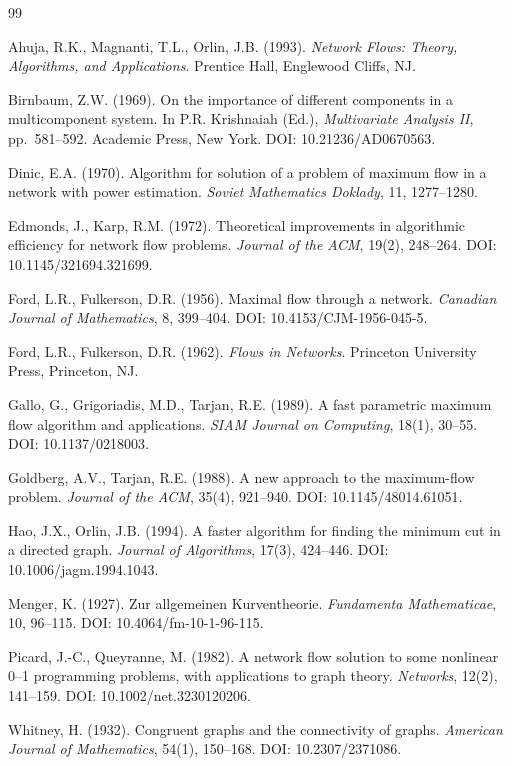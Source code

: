 \documentclass[12pt]{report}
\begin{document}
\begin{thebibliography}{99}

Ahuja, R.K., Magnanti, T.L., Orlin, J.B. (1993). \textit{Network Flows: Theory, Algorithms, and Applications}. Prentice Hall, Englewood Cliffs, NJ.

Birnbaum, Z.W. (1969). On the importance of different components in a multicomponent system. In P.R. Krishnaiah (Ed.), \textit{Multivariate Analysis II}, pp.\ 581--592. Academic Press, New York. DOI: 10.21236/AD0670563.

Dinic, E.A. (1970). Algorithm for solution of a problem of maximum flow in a network with power estimation. \textit{Soviet Mathematics Doklady}, 11, 1277--1280.

Edmonds, J., Karp, R.M. (1972). Theoretical improvements in algorithmic efficiency for network flow problems. \textit{Journal of the ACM}, 19(2), 248--264. DOI: 10.1145/321694.321699.

Ford, L.R., Fulkerson, D.R. (1956). Maximal flow through a network. \textit{Canadian Journal of Mathematics}, 8, 399--404. DOI: 10.4153/CJM-1956-045-5.

Ford, L.R., Fulkerson, D.R. (1962). \textit{Flows in Networks}. Princeton University Press, Princeton, NJ.

Gallo, G., Grigoriadis, M.D., Tarjan, R.E. (1989). A fast parametric maximum flow algorithm and applications. \textit{SIAM Journal on Computing}, 18(1), 30--55. DOI: 10.1137/0218003.

Goldberg, A.V., Tarjan, R.E. (1988). A new approach to the maximum-flow problem. \textit{Journal of the ACM}, 35(4), 921--940. DOI: 10.1145/48014.61051.

Hao, J.X., Orlin, J.B. (1994). A faster algorithm for finding the minimum cut in a directed graph. \textit{Journal of Algorithms}, 17(3), 424--446. DOI: 10.1006/jagm.1994.1043.

Menger, K. (1927). Zur allgemeinen Kurventheorie. \textit{Fundamenta Mathematicae}, 10, 96--115. DOI: 10.4064/fm-10-1-96-115.

Picard, J.-C., Queyranne, M. (1982). A network flow solution to some nonlinear 0--1 programming problems, with applications to graph theory. \textit{Networks}, 12(2), 141--159. DOI: 10.1002/net.3230120206.

Whitney, H. (1932). Congruent graphs and the connectivity of graphs. \textit{American Journal of Mathematics}, 54(1), 150--168. DOI: 10.2307/2371086.

\end{thebibliography}
\end{document}
